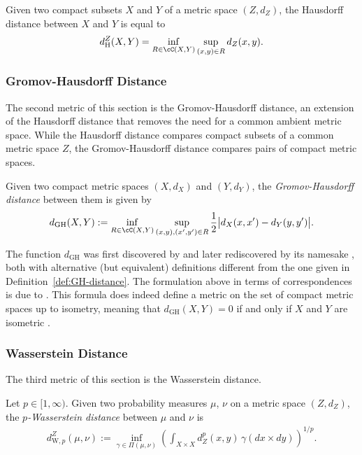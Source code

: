 \documentclass[twoside,11pt]{article}
\newcommand{\op}[1]{\operatorname{#1}}
\newcommand{\dWp}[1]{d_{\mathrm{W},#1}}
\newcommand{\dH}{d_\mathrm{H}}
\begin{document}
\begin{proposition}
  Given two compact subsets $X$ and $Y$ of a metric space $(Z,d_Z)$, the Hausdorff distance between $X$ and $Y$ is equal to
  \begin{align*}
    \dH^Z(X,Y) = \inf_{R\in \cC(X,Y)} \sup_{(x,y) \in R} d_Z(x,y).
  \end{align*}
\end{proposition}


\subsubsection{Gromov-Hausdorff Distance}
The second metric of this section is the Gromov-Hausdorff distance, an extension of the Hausdorff distance that removes the need for a common ambient metric space. While the Hausdorff distance compares compact subsets of a common metric space $Z$, the Gromov-Hausdorff distance compares pairs of compact metric spaces.

\begin{definition}\label{def:GH-distance}
  Given two compact metric spaces $(X,d_X)$ and $(Y,d_Y)$, the \emph{Gromov-Hausdorff distance} between them is given by
  \begin{align*}
    d_{\op{GH}}(X,Y) := \inf_{R\in \cC(X,Y)} \sup_{(x,y), (x',y') \in R} \frac{1}{2} \big|d_X(x,x') - d_Y(y,y')\big|.
  \end{align*}
\end{definition}

The function $d_{\op{GH}}$ was first discovered by \citet[Def. III.3]{edwards_structure_1975} and later rediscovered by its namesake \citet{gromov_structures_1981}, both with alternative (but equivalent) definitions different from the one given in Definition~\ref{def:GH-distance}. The formulation above in terms of correspondences is due to \citet{Kalton_Mikhail_1997}.
This formula does indeed define a metric on the set of compact metric spaces up to isometry, meaning that $d_{\op{GH}}(X,Y) = 0$ if and only if $X$ and $Y$ are isometric \citep[Thm. 7.3.30]{BBI}.

\subsubsection{Wasserstein Distance}

The third metric of this section is the Wasserstein distance.
\begin{definition}[Kantorovich, 1942]
  Let $p\in [1,\infty)$. Given two probability measures $\mu$, $\nu$ on a metric space $(Z,d_Z)$, the \emph{$p$-Wasserstein distance} between $\mu$ and $\nu$ is
  \begin{align*}
    \dWp{p}^Z(\mu,\nu) := \inf_{\gamma\in \Pi(\mu,\nu)} \left(\int_{X\times X} d_Z^p(x,y) \, \gamma(dx\times dy) \right)^{1/p}.
  \end{align*}
\end{definition}
\end{document}
